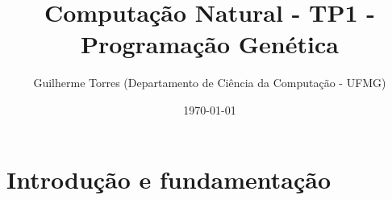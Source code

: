 \documentclass[11pt]{article}
\begin{document}
\title{Computação Natural - TP1 - Programação Genética}
\author{Guilherme Torres (Departamento de Ciência da Computação - UFMG)}
\date{\today}
\maketitle

\section{Introdução e fundamentação}
\end{document}

